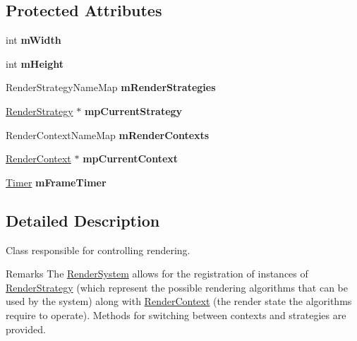 \subsection*{\-Protected \-Attributes}
\begin{DoxyCompactItemize}
\item 
\hypertarget{class_verdi_1_1_render_system_aa8001d72babfdd50341ecfc963ed6a62}{int {\bfseries m\-Width}}\label{class_verdi_1_1_render_system_aa8001d72babfdd50341ecfc963ed6a62}

\item 
\hypertarget{class_verdi_1_1_render_system_a548163503553fe65e65ff40f069c2788}{int {\bfseries m\-Height}}\label{class_verdi_1_1_render_system_a548163503553fe65e65ff40f069c2788}

\item 
\hypertarget{class_verdi_1_1_render_system_aa07ed3ce0d33c3e506d5e073e3ff088c}{\-Render\-Strategy\-Name\-Map {\bfseries m\-Render\-Strategies}}\label{class_verdi_1_1_render_system_aa07ed3ce0d33c3e506d5e073e3ff088c}

\item 
\hypertarget{class_verdi_1_1_render_system_ab826c454317b170998982020757ac945}{\hyperlink{class_verdi_1_1_render_strategy}{\-Render\-Strategy} $\ast$ {\bfseries mp\-Current\-Strategy}}\label{class_verdi_1_1_render_system_ab826c454317b170998982020757ac945}

\item 
\hypertarget{class_verdi_1_1_render_system_a8fb6c0ebd2b9703549928c0654df7ac8}{\-Render\-Context\-Name\-Map {\bfseries m\-Render\-Contexts}}\label{class_verdi_1_1_render_system_a8fb6c0ebd2b9703549928c0654df7ac8}

\item 
\hypertarget{class_verdi_1_1_render_system_ab34b7f048930f5db95dbabc17a752bea}{\hyperlink{class_verdi_1_1_render_context}{\-Render\-Context} $\ast$ {\bfseries mp\-Current\-Context}}\label{class_verdi_1_1_render_system_ab34b7f048930f5db95dbabc17a752bea}

\item 
\hypertarget{class_verdi_1_1_render_system_a3500e7c7ba24c29d1dff500d2a1c442b}{\hyperlink{class_verdi_1_1_timer}{\-Timer} {\bfseries m\-Frame\-Timer}}\label{class_verdi_1_1_render_system_a3500e7c7ba24c29d1dff500d2a1c442b}

\end{DoxyCompactItemize}


\subsection{\-Detailed \-Description}
\-Class responsible for controlling rendering. \begin{DoxyRemark}{\-Remarks}
\-The \hyperlink{class_verdi_1_1_render_system}{\-Render\-System} allows for the registration of instances of \hyperlink{class_verdi_1_1_render_strategy}{\-Render\-Strategy} (which represent the possible rendering algorithms that can be used by the system) along with \hyperlink{class_verdi_1_1_render_context}{\-Render\-Context} (the render state the algorithms require to operate). \-Methods for switching between contexts and strategies are provided. 
\end{DoxyRemark}


